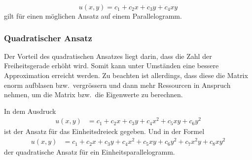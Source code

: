\begin{equation}
	u(x,y) = c_1 + c_2 x + c_3 y + c_4 xy
\end{equation} 
gilt für einen möglichen Ansatz auf einem Parallelogramm.

\subsubsection{Quadratischer Ansatz
\label{fem:subsection:bonorum}}

Der Vorteil des quadratischen Ansatzes liegt darin, dass die
Zahl der Freiheitsgerade erhöht wird.
Somit kann unter Umständen eine bessere Approximation erreicht werden.
Zu beachten ist allerdings, dass diese die Matrix enorm aufblasen
bzw.~vergrössern und dann mehr Ressourcen in Anspruch nehmen, um
die Matrix bzw.~die Eigenwerte zu berechnen.

In dem Ausdruck
\begin{align}
u(x,y) &= c_1 + c_2 x + c_3 y + c_4 x^2 + c_5 xy + c_6 y^2
\label{fem:equationSchwarzquadratischD} 
\end{align}	
ist der Ansatz für das Einheitsdreieck gegeben.
Und in der Formel
\begin{align}
u(x,y) &= c_1 + c_2 x + c_3 y + c_4 x^2 + c_5 xy + c_6 y^2 + c_7 x^2y + c_8 xy^2 \label{fem:equationSchwarzquadratischP}
\end{align}
der quadratische Ansatz für ein Einheitsparallelogramm.




